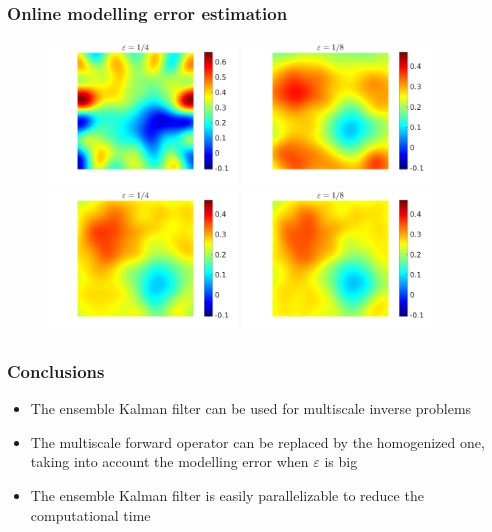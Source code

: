 \begin{frame}
\frametitle{Online modelling error estimation}
\begin{figure}[t]
\centering
\includegraphics[width = 0.45\textwidth]{Images/ensemble_500_e4}
\includegraphics[width = 0.45\textwidth]{Images/ensemble_500_e8}
\\
\includegraphics[width = 0.45\textwidth]{Images/ensemble_500_e4_model_error_Levels}
\includegraphics[width = 0.45\textwidth]{Images/ensemble_500_e8_model_error_Levels}
\end{figure}
\end{frame}

\begin{frame}
\frametitle{Conclusions}
\begin{itemize}
\setlength\itemsep{2em}
\item The ensemble Kalman filter can be used for multiscale inverse problems
\item The multiscale forward operator can be replaced by the homogenized one, taking into account the modelling error when $\varepsilon$ is big
\item The ensemble Kalman filter is easily parallelizable to reduce the computational time
\end{itemize}
\end{frame}